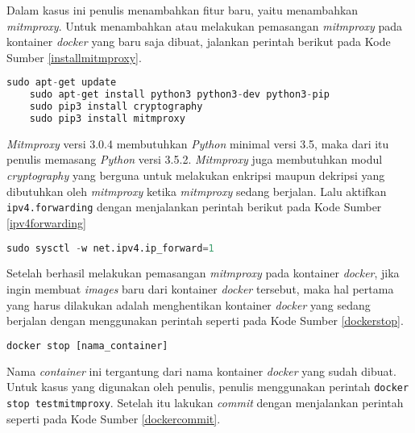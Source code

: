 	\indent Dalam kasus ini penulis menambahkan fitur baru, yaitu menambahkan \textit{mitmproxy}. Untuk menambahkan atau melakukan pemasangan \textit{mitmproxy} pada kontainer \textit{docker} yang baru saja dibuat, jalankan perintah berikut pada Kode Sumber \ref{installmitmproxy}.
	\newline
	\begin{minipage}{\linewidth}
	\begin{lstlisting}[caption=Perintah untuk Pemasangan \textit{Mitmproxy},language=Python,label=installmitmproxy]
	sudo apt-get update
	sudo apt-get install python3 python3-dev python3-pip
	sudo pip3 install cryptography
	sudo pip3 install mitmproxy
	\end{lstlisting}
	\end{minipage}
	\textit{Mitmproxy} versi 3.0.4 membutuhkan \textit{Python} minimal versi 3.5, maka dari itu penulis memasang \textit{Python} versi 3.5.2. \textit{Mitmproxy} juga membutuhkan modul \textit{cryptography} yang berguna untuk melakukan enkripsi maupun dekripsi yang dibutuhkan oleh \textit{mitmproxy} ketika \textit{mitmproxy} sedang berjalan. Lalu aktifkan \texttt{ipv4.forwarding} dengan menjalankan perintah berikut pada Kode Sumber \ref{ipv4forwarding}\\
	\newline
	\begin{minipage}{\linewidth}
	\begin{lstlisting}[caption=Perintah untuk Mengaktifkan \textit{ipv4.forwarding},language=Python,label=ipv4forwarding]
  sudo sysctl -w net.ipv4.ip_forward=1
	\end{lstlisting}
	\end{minipage}
	\indent Setelah berhasil melakukan pemasangan \textit{mitmproxy} pada kontainer \textit{docker}, jika ingin membuat \textit{images} baru dari kontainer \textit{docker} tersebut, maka hal pertama yang harus dilakukan adalah menghentikan kontainer \textit{docker} yang sedang berjalan dengan menggunakan perintah seperti pada Kode Sumber \ref{dockerstop}.
	\newline
	\begin{minipage}{\linewidth}
	\begin{lstlisting}[caption=Perintah untuk Menghentikan Kontainer \textit{Docker},language=Python,label=dockerstop]
	docker stop [nama_container]
	\end{lstlisting}
	\end{minipage}
	Nama \textit{container} ini tergantung dari nama kontainer \textit{docker} yang sudah dibuat. Untuk kasus yang digunakan oleh penulis, penulis menggunakan perintah \texttt{docker stop testmitmproxy}. Setelah itu lakukan \textit{commit} dengan menjalankan perintah seperti pada Kode Sumber \ref{dockercommit}.
